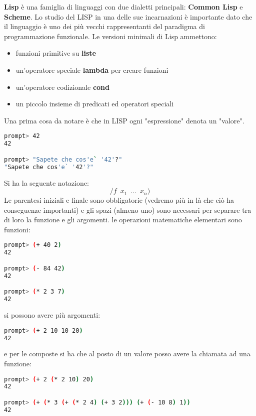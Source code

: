\documentclass[a4paper,12pt, oneside]{book}
\begin{document}
\textbf{Lisp} è una famiglia di linguaggi con due dialetti principali: \textbf{Common Lisp} e \textbf{Scheme}. Lo studio del LISP in una delle sue incarnazioni è importante dato che il linguaggio è uno dei più vecchi rappresentanti del paradigma di programmazione funzionale. Le versioni minimali di Lisp ammettono:
\begin{itemize}
\item funzioni primitive su \textbf{liste}
\item un'operatore speciale \textbf{lambda} per creare funzioni
\item un'operatore codizionale \textbf{cond}
\item un piccolo insieme di predicati ed operatori speciali
\end{itemize}
Una prima cosa da notare è che in LISP ogni "espressione" denota un
"valore".
\begin{shaded}
\begin{lstlisting}[language=bash]
prompt> 42
42

prompt> "Sapete che cos'e` '42'?"
"Sapete che cos'e` '42'?"
\end{lstlisting}
\end{shaded} Si ha la seguente notazione:
$$/f\,\,\, x_1\,\,\,...\,\,\, x_n)$$
Le parentesi iniziali e finale sono obbligatorie (vedremo più in là
che ciò ha conseguenze importanti) e gli spazi (almeno uno)
sono necessari per separare tra di loro la funzione e gli argomenti.
le operazioni matematiche elementari sono funzioni:
\begin{shaded}
\begin{lstlisting}[language=bash]
prompt> (+ 40 2)
42

prompt> (- 84 42)
42

prompt> (* 2 3 7)
42
\end{lstlisting}
\end{shaded}
si possono avere più argomenti:
\begin{shaded}
\begin{lstlisting}[language=bash]
prompt> (+ 2 10 10 20)
42
\end{lstlisting}
\end{shaded}
e per le composte si ha che al posto di un valore posso avere la chiamata ad una funzione: 
\begin{shaded}
\begin{lstlisting}[language=bash]
prompt> (+ 2 (* 2 10) 20)
42

prompt> (+ (* 3 (+ (* 2 4) (+ 3 2))) (+ (- 10 8) 1))
42
\end{lstlisting}
\end{shaded}
\end{document}
